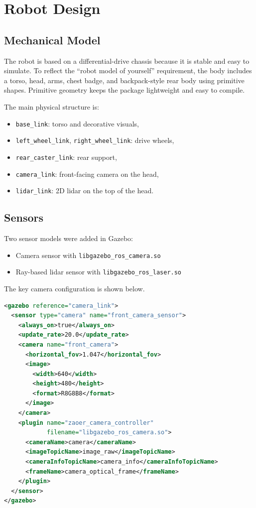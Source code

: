 \documentclass[11pt,a4paper]{article}
\begin{document}
\section{Robot Design}
\subsection{Mechanical Model}
The robot is based on a differential-drive chassis because it is stable and easy to simulate. To reflect the ``robot model of yourself'' requirement, the body includes a torso, head, arms, chest badge, and backpack-style rear body using primitive shapes. Primitive geometry keeps the package lightweight and easy to compile.

The main physical structure is:

\begin{itemize}
  \item \texttt{base\_link}: torso and decorative visuals,
  \item \texttt{left\_wheel\_link}, \texttt{right\_wheel\_link}: drive wheels,
  \item \texttt{rear\_caster\_link}: rear support,
  \item \texttt{camera\_link}: front-facing camera on the head,
  \item \texttt{lidar\_link}: 2D lidar on the top of the head.
\end{itemize}

\subsection{Sensors}
Two sensor models were added in Gazebo:

\begin{itemize}
  \item Camera sensor with \texttt{libgazebo\_ros\_camera.so}
  \item Ray-based lidar sensor with \texttt{libgazebo\_ros\_laser.so}
\end{itemize}

The key camera configuration is shown below.

\begin{lstlisting}[style=labcode,language=XML]
<gazebo reference="camera_link">
  <sensor type="camera" name="front_camera_sensor">
    <always_on>true</always_on>
    <update_rate>20.0</update_rate>
    <camera name="front_camera">
      <horizontal_fov>1.047</horizontal_fov>
      <image>
        <width>640</width>
        <height>480</height>
        <format>R8G8B8</format>
      </image>
    </camera>
    <plugin name="zaoer_camera_controller"
            filename="libgazebo_ros_camera.so">
      <cameraName>camera</cameraName>
      <imageTopicName>image_raw</imageTopicName>
      <cameraInfoTopicName>camera_info</cameraInfoTopicName>
      <frameName>camera_optical_frame</frameName>
    </plugin>
  </sensor>
</gazebo>
\end{lstlisting}
\end{document}
